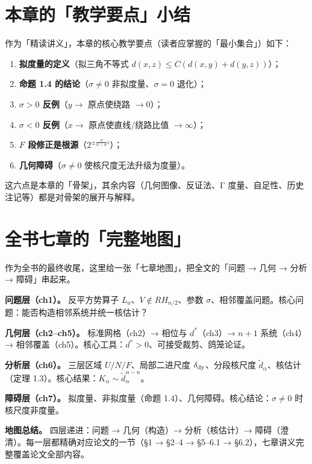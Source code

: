 \documentclass[a4paper,11pt,openany]{ctexbook}
\numberwithin{equation}{chapter}
\numberwithin{figure}{chapter}
\numberwithin{table}{chapter}
\begin{document}
\section{本章的「教学要点」小结}

作为「精读讲义」，本章的核心教学要点（读者应掌握的「最小集合」）如下：

\begin{enumerate}
\item \textbf{拟度量的定义}（拟三角不等式 $d(x,z)\le C(d(x,y)+d(y,z))$）；
\item \textbf{命题 1.4 的结论}（$\sigma\neq0$ 非拟度量、$\sigma=0$ 退化）；
\item \textbf{$\sigma>0$ 反例}（$y\to$ 原点使绕路 $\to0$）；
\item \textbf{$\sigma<0$ 反例}（$x\to$ 原点使直线/绕路比值 $\to\infty$）；
\item \textbf{$F$ 段修正是根源}（$2^{\pm\frac{\sigma}{n-\alpha}\iota}$）；
\item \textbf{几何障碍}（$\sigma\neq0$ 使核尺度无法升级为度量）。
\end{enumerate}

这六点是本章的「骨架」，其余内容（几何图像、反证法、Γ 度量、自足性、历史注记等）都是对骨架的展开与解释。

\section{全书七章的「完整地图」}

作为全书的最终收尾，这里给一张「七章地图」，把全文的「问题 → 几何 → 分析 → 障碍」串起来。

\textbf{问题层（ch1）。} 反平方势算子 $L_a$、$V\notin RH_{n/2}$、参数 $\sigma$、相邻覆盖问题。核心问题：能否构造相邻系统并统一核估计？

\textbf{几何层（ch2–ch5）。} 标准网格（ch2）→ 相位与 $d^*$（ch3）→ $n+1$ 系统（ch4）→ 相邻覆盖（ch5）。核心工具：$d^*>0$、可接受裁剪、鸽笼论证。

\textbf{分析层（ch6）。} 三层区域 $U/N/F$、局部二进尺度 $\delta_{\rm dy}$、分段核尺度 $\widetilde d_\alpha$、核估计（定理 1.3）。核心结果：$K_\alpha\sim\widetilde d_\alpha^{\alpha-n}$。

\textbf{障碍层（ch7）。} 拟度量、非拟度量（命题 1.4）、几何障碍。核心结论：$\sigma\neq0$ 时核尺度非度量。

\textbf{地图总结。} 四层递进：问题 → 几何（构造）→ 分析（核估计）→ 障碍（澄清）。每一层都精确对应论文的一节（§1 → §2–4 → §5–6.1 → §6.2），七章讲义完整覆盖论文全部内容。
\end{document}
